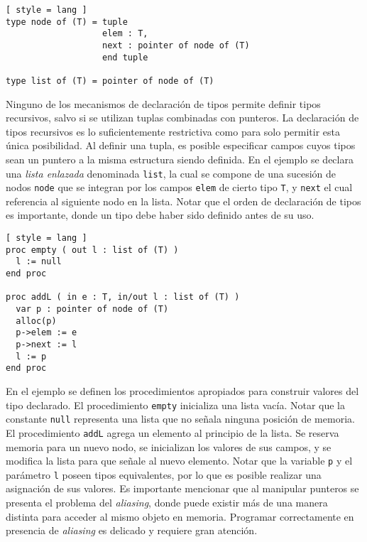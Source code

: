 \begin{lstlisting}[ style = lang ]
type node of (T) = tuple
                   elem : T,
                   next : pointer of node of (T)
                   end tuple
                   
type list of (T) = pointer of node of (T)
\end{lstlisting}

Ninguno de los mecanismos de declaración de tipos permite definir tipos recursivos, salvo si se utilizan tuplas combinadas con punteros.
La declaración de tipos recursivos es lo suficientemente restrictiva como para solo permitir esta única posibilidad.
Al definir una tupla, es posible especificar campos cuyos tipos sean un puntero a la misma estructura siendo definida.
En el ejemplo se declara una \textit{lista enlazada} denominada \lstinline[style = lang]{list}, la cual se compone de una sucesión de nodos \lstinline[style = lang]{node} que se integran por los campos \lstinline[style = lang]{elem} de cierto tipo \lstinline[style = lang]{T}, y \lstinline[style = lang]{next} el cual referencia al siguiente nodo en la lista.
Notar que el orden de declaración de tipos es importante, donde un tipo debe haber sido definido antes de su uso.

\begin{lstlisting}[ style = lang ]
proc empty ( out l : list of (T) )
  l := null
end proc

proc addL ( in e : T, in/out l : list of (T) )
  var p : pointer of node of (T)
  alloc(p)
  p->elem := e
  p->next := l
  l := p
end proc
\end{lstlisting}

En el ejemplo se definen los procedimientos apropiados para construir valores del tipo declarado.
El procedimiento \lstinline[style = lang]{empty} inicializa una lista vacía.
Notar que la constante \lstinline[style = lang]{null} representa una lista que no señala ninguna posición de memoria.
El procedimiento \lstinline[style = lang]{addL} agrega un elemento al principio de la lista.
Se reserva memoria para un nuevo nodo, se inicializan los valores de sus campos, y se modifica la lista para que señale al nuevo elemento.
Notar que la variable \lstinline[style = lang]{p} y el parámetro \lstinline[style = lang]{l} poseen tipos equivalentes, por lo que es posible realizar una asignación de sus valores.
Es importante mencionar que al manipular punteros se presenta el problema del \textit{aliasing}, donde puede existir más de una manera distinta para acceder al mismo objeto en memoria.
Programar correctamente en presencia de \textit{aliasing} es delicado y requiere gran atención.
\fi


